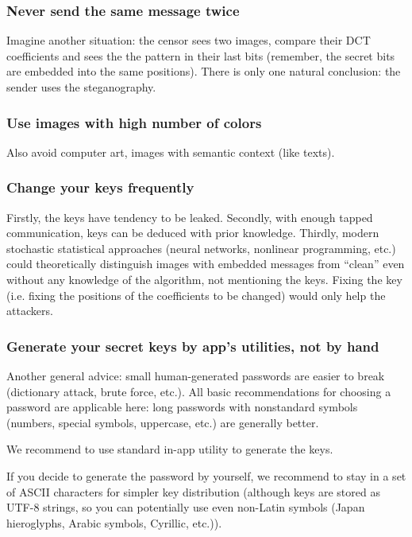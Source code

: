 \subsubsection{Never send the same message twice}

Imagine another situation: the censor sees two images, compare their DCT coefficients
and sees the the pattern in their last bits (remember, the secret bits are embedded into
the same positions). There is only one natural conclusion: the sender uses the steganography.

\subsubsection{Use images with high number of colors}
Also avoid computer art, images with semantic context (like texts).

\subsubsection{Change your keys frequently}
Firstly, the keys have tendency to be leaked. Secondly, with enough tapped communication,
keys can be deduced with prior knowledge. Thirdly, modern stochastic statistical approaches 
(neural networks, nonlinear programming, etc.) could theoretically distinguish images with
embedded messages from ``clean'' even without any knowledge of the algorithm, not mentioning
the keys. Fixing the key (i.e. fixing the positions of the coefficients to be changed)
would only help the attackers.


\subsubsection{Generate your secret keys by app's utilities, not by hand}
Another general advice: small human-generated passwords are easier to break (dictionary attack,
brute force, etc.). All basic recommendations for choosing a password are applicable here: long passwords
with nonstandard symbols (numbers, special symbols, uppercase, etc.) are generally better.

We recommend to use standard in-app utility to generate the keys.

If you decide to generate the password by yourself, 
we recommend to stay in a set of ASCII characters for simpler key distribution (although keys are
stored as UTF-8 strings, so you can potentially use even non-Latin symbols 
(Japan hieroglyphs, Arabic symbols, Cyrillic, etc.)).

